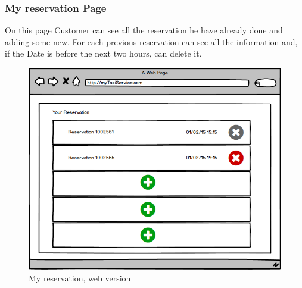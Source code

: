 			\subsubsection{My reservation Page}
			On this page Customer can see all the reservation he have already done and adding some new. For each previous reservation can see all the information and, if the Date is before the next two hours, can delete it.			
			
				\begin{figure}[H]
					\centering
					\includegraphics[scale=0.5]{IMG/UserInterfaces/myReservation.png}
					\caption{My reservation, web version}\label{myreservation_w}
				\end{figure}
